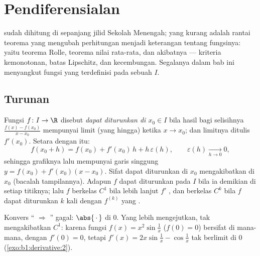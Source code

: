 \chapter{Pendiferensialan}\label{ch:b1:derivative}

 sudah dihitung di sepanjang jilid Sekolah Menengah; yang
kurang adalah rantai teorema yang mengubah perhitungan menjadi
keterangan tentang fungsinya: yaitu teorema Rolle, teorema nilai rata-rata,
dan akibatnya --- kriteria kemonotonan, batas Lipschitz, dan
kecembungan. Segalanya dalam bab ini menyangkut fungsi yang terdefinisi pada
sebuah  $I$.

\section{Turunan}

\begin{definition}\label{def:b1:derivative:def}
Fungsi $f \colon I \to \R$ disebut \emph{dapat diturunkan di $x_0 \in
I$} bila hasil bagi selisihnya
$\frac{f(x) - f(x_0)}{x - x_0}$ mempunyai limit (yang hingga) ketika $x \to x_0$;
dan limitnya ditulis $f'(x_0)$. Setara dengan itu:
\[
f(x_0 + h) = f(x_0) + f'(x_0)\,h + h\,\varepsilon(h),
\qquad \varepsilon(h) \xrightarrow[h \to 0]{} 0 ,
\]
sehingga grafiknya lalu mempunyai garis singgung $y = f(x_0) + f'(x_0)(x -
x_0)$. Sifat dapat diturunkan di $x_0$ mengakibatkan  di $x_0$ (bacalah
tampilannya). Adapun $f$ dapat diturunkan pada $I$ bila ia demikian di setiap titiknya;
lalu $f$ berkelas $C^1$ bila lebih lanjut $f'$ , dan berkelas
$C^k$ bila $f$ dapat
diturunkan $k$ kali dengan $f^{(k)}$ yang .
\end{definition}

\begin{example}\label{ex:b1:derivative:notc1}
Konvers `` $\Rightarrow$ '' gagal:
$\abs{\,\cdot\,}$ di $0$. Yang lebih mengejutkan,  tak
mengakibatkan $C^1$: karena fungsi $f(x) = x^2 \sin\frac 1x$ ($f(0) = 0$) bersifat
 di mana-mana, dengan $f'(0) = 0$, tetapi $f'(x) = 2x
\sin\frac1x - \cos\frac 1x$ tak berlimit di $0$
(\cref{exo:b1:derivative:2}).
\end{example}

